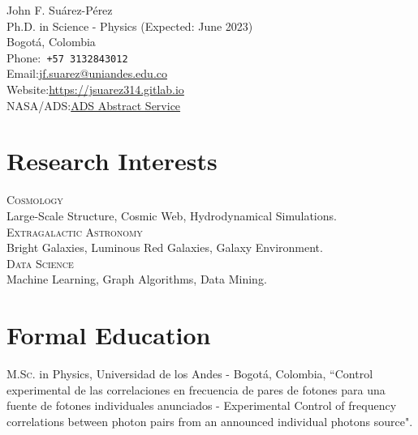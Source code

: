 \documentclass[10pt, a4paper]{article}
\newcommand{\years}[1]{\marginnote{\scriptsize #1}}
\begin{document}
{\LARGE John F. Suárez-Pérez}\\[1cm]
Ph.D. in Science - Physics (Expected: June 2023) \\
Bogotá, Colombia\\[.2cm]
Phone:\hspace{0.2cm}\texttt{ +57 3132843012 }\\
Email:\hspace{0.5cm}\href{mailto:jf.suarez@uniandes.edu.co}{jf.suarez@uniandes.edu.co}\\
Website:\hspace{0.16cm}\href{https://jsuarez314.gitlab.io}{https://jsuarez314.gitlab.io}\\
NASA/ADS:\hspace{0.16cm}\href{https://ui.adsabs.harvard.edu/search/p_=0&q=\%20author\%3A\%22Su\%C3\%A1rez-P\%C3\%A9rez\%2C\%20John\%20F.\%22&sort=date\%20desc\%2C\%20bibcode\%20desc}{ADS Abstract Service}


\section*{Research Interests}
\noindent
\textsc{Cosmology}\\
 Large-Scale Structure, Cosmic Web, Hydrodynamical Simulations.\\

\textsc{Extragalactic Astronomy}\\
Bright Galaxies, Luminous Red Galaxies, Galaxy Environment.\\

\textsc{Data Science}\\
Machine Learning, Graph Algorithms, Data Mining.

\section*{Formal Education}
\noindent
\years{2018}\textsc{M.Sc.} in Physics, Universidad de los Andes - Bogotá, Colombia, “Control experimental de las correlaciones en frecuencia de pares de fotones para una fuente de fotones individuales anunciados - Experimental Control of frequency correlations between photon pairs from an announced individual photons source".\\
\end{document}
